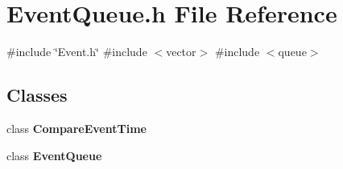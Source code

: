 \section{Event\+Queue.\+h File Reference}
\label{EventQueue_8h}
{\ttfamily \#include \char`\"{}Event.\+h\char`\"{}}\newline
{\ttfamily \#include $<$vector$>$}\newline
{\ttfamily \#include $<$queue$>$}\newline
\subsection*{Classes}
\begin{DoxyCompactItemize}
\item 
class \textbf{ Compare\+Event\+Time}
\item 
class \textbf{ Event\+Queue}
\end{DoxyCompactItemize}

